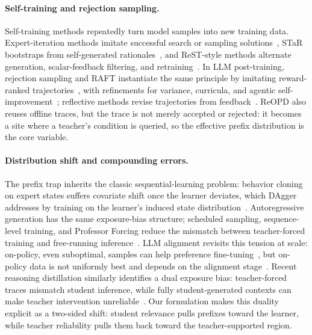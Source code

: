 \paragraph{Self-training and rejection sampling.}
Self-training methods repeatedly turn model samples into new training data.
Expert-iteration methods imitate successful search or sampling
solutions~\citep{anthony2017thinking}, STaR bootstraps from self-generated
rationales~\citep{zelikman2022star}, and ReST-style methods alternate generation,
scalar-feedback filtering, and retraining~\citep{gulcehre2023reinforced,singh2023beyond}.
In LLM post-training, rejection sampling and RAFT instantiate the same principle by
imitating reward-ranked trajectories~\citep{dong2023raft,liu2023statistical,xiong2025minimalist},
with refinements for variance, curricula, and agentic
self-improvement~\citep{yao2025optimizing,zhao2024automatic,aksitov2023rest};
reflective methods revise trajectories from feedback~\citep{shinn2024reflexion}. ReOPD also reuses
offline traces, but the trace is not merely accepted or rejected: it becomes a site
where a teacher's condition is queried, so the effective prefix distribution is the
core variable.

\paragraph{Distribution shift and compounding errors.}
The prefix trap inherits the classic sequential-learning problem: behavior cloning on expert states suffers covariate shift once the learner deviates, which DAgger
addresses by training on the learner's induced state distribution~\citep{ross2011reduction}.
Autoregressive generation has the same exposure-bias structure; scheduled sampling,
sequence-level training, and Professor Forcing reduce the mismatch between
teacher-forced training and free-running inference~\citep{bengio2015scheduled,ranzato2016sequence,lamb2016professor}.
LLM alignment revisits this tension at scale: on-policy, even suboptimal, samples can
help preference fine-tuning~\citep{tajwar2024preference}, but on-policy data is not
uniformly best and depends on the alignment stage~\citep{sun2025onpolicydata}. Recent reasoning distillation similarly identifies a dual exposure bias: teacher-forced
traces mismatch student inference, while fully student-generated contexts can make
teacher intervention unreliable~\citep{wang2026backtracking}. Our formulation makes this duality explicit as a two-sided shift: student relevance pulls prefixes toward
the learner, while teacher reliability pulls them back toward the teacher-supported
region.
